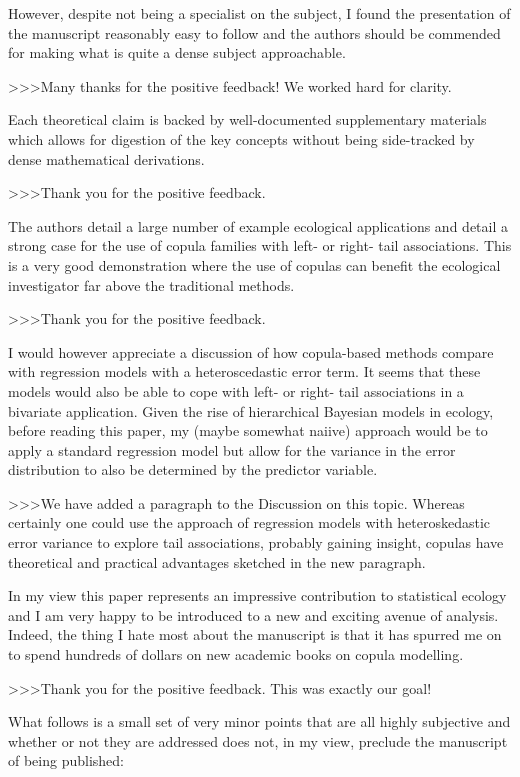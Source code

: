 However, despite not being a specialist on the subject, I found the presentation of the manuscript 
reasonably easy to follow and the authors should be commended for making what is quite a dense 
subject approachable.  

>>>Many thanks for the positive feedback! We worked hard for clarity.

Each theoretical claim is backed by well-documented supplementary materials which allows for 
digestion of the key concepts without being side-tracked by dense mathematical derivations.

>>>Thank you for the positive feedback.

The authors detail a large number of example ecological applications and detail a strong case 
for the use of copula families with left- or right- tail associations.  This is a very good 
demonstration where the use of copulas can benefit the ecological investigator far above the 
traditional methods.  

>>>Thank you for the positive feedback.

I would however appreciate a discussion of how copula-based methods compare with regression 
models with a heteroscedastic error term.  It seems that these models would also be able to 
cope with left- or right- tail associations in a bivariate application.  Given the rise of 
hierarchical Bayesian models in ecology, before reading this paper, my (maybe somewhat naiive) 
approach would be to apply a standard regression model but allow for the variance in the error 
distribution to also be determined by the predictor variable.

>>>We have added a paragraph to the Discussion on this topic. Whereas certainly 
one could use the approach of regression models with heteroskedastic error variance to 
explore tail associations, probably gaining insight, copulas have theoretical 
and practical advantages sketched in the new paragraph.

In my view this paper represents an impressive contribution to statistical ecology and I am 
very happy to be introduced to a new and exciting avenue of analysis.  Indeed, the thing I 
hate most about the manuscript is that it has spurred me on to spend hundreds of dollars on 
new academic books on copula modelling.

>>>Thank you for the positive feedback. This was exactly our goal!

What follows is a small set of very minor points that are all highly subjective and whether 
or not they are addressed does not, in my view, preclude the manuscript of being published:

